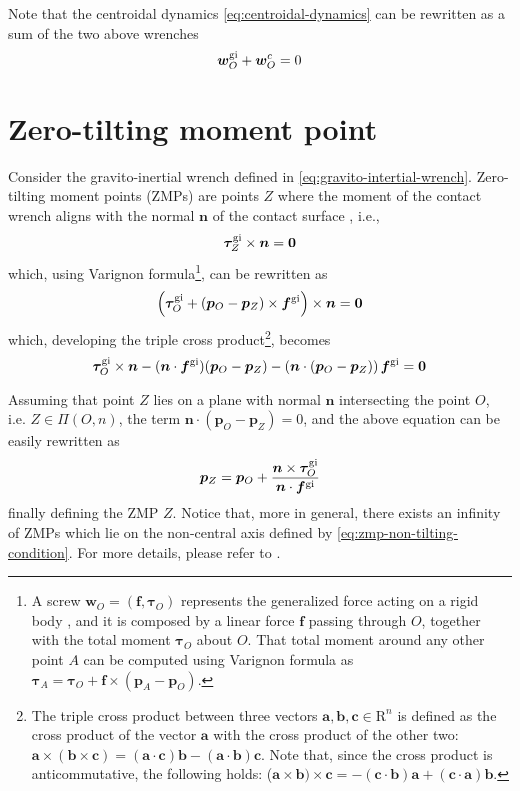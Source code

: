 Note that the centroidal dynamics \eqref{eq:centroidal-dynamics} can be
rewritten as a sum of the two above wrenches
\begin{equation}
    \bm{w}_O^{\rm gi} + \bm{w}_O^c = 0
\end{equation}

\section{Zero-tilting moment point}
\label{sec:zero-tilting-moment-point}
Consider the gravito-inertial wrench defined in \ref{eq:gravito-intertial-wrench}. Zero-tilting moment points (ZMPs) are points $Z$ where the moment of the contact wrench aligns with the normal $\bm{n}$ of the contact surface \cite{SardainBessonnet2004}, i.e.,
\begin{equation}
    \label{eq:zmp-non-tilting-condition}
    \bm{\tau}_Z^{\rm gi} \times \bm{n} = \bm{0}
\end{equation}
which, using Varignon formula\footnote{A screw $\bm{w}_O =
(\bm{f},\bm{\tau}_O)$ represents the generalized force acting on a rigid body
\cite{Featherstone2007RigidBodyDynamicsAlgorithms},
and it is composed by a linear force $\bm{f}$ passing through $O$, together with the
total moment $\bm{\tau}_O$ about $O$. That total moment around any other point
$A$ can be computed using Varignon formula as $\bm{\tau}_A=\bm{\tau}_O+\bm{f}\times(\bm{p}_A-\bm{p}_O)$.}, can be rewritten as
\begin{equation}
    \left(\bm{\tau}_O^{\rm gi} + (\bm{p}_O - \bm{p}_Z) \times \bm{f}^{\rm gi}\right) \times \bm{n} = \bm{0}
\end{equation}
which, developing the triple cross product\footnote{The triple cross product
between three vectors $\bm{a}, \bm{b}, \bm{c} \in \mathrm{R}^n$ is defined as
the cross product of the vector $\bm{a}$ with the cross product of the other
two: $\bm{a}\times(\bm{b}\times\bm{c})=(\bm{a}\cdot\bm{c})\bm{b}-
(\bm{a}\cdot\bm{b})\bm{c}$. Note that, since the cross product is anticommutative,
the following holds:
($\bm{a}\times\bm{b})\times\bm{c}=-(\bm{c}\cdot\bm{b})\bm{a}+
(\bm{c}\cdot\bm{a})\bm{b}$.}, becomes
\begin{equation}
    \bm{\tau}_O^{\rm gi} \times \bm{n} - (\bm{n} \cdot \bm{f}^{\rm gi}) (\bm{p}_O - \bm{p}_Z) - \left(\bm{n} \cdot (\bm{p}_O - \bm{p}_Z)\right) \bm{f}^{\rm gi} = \bm{0}
\end{equation}

Assuming that point $Z$ lies on a plane with normal $\bm{n}$ intersecting the point $O$, i.e. $Z \in \Pi(O, n)$, the term $\bm{n} \cdot (\bm{p}_O - \bm{p}_Z) = 0$, and the above equation can be easily rewritten as
\begin{equation}
    \bm{p}_Z = \bm{p}_O + \frac{\bm{n} \times \bm{\tau}_O^{\rm gi}}{\bm{n} \cdot \bm{f}^{\rm gi}}
\end{equation}
finally defining the ZMP $Z$. Notice that, more in general, there exists an infinity of ZMPs which lie on the non-central axis defined by \eqref{eq:zmp-non-tilting-condition}. For more details, please refer to \cite{SardainBessonnet2004}.


